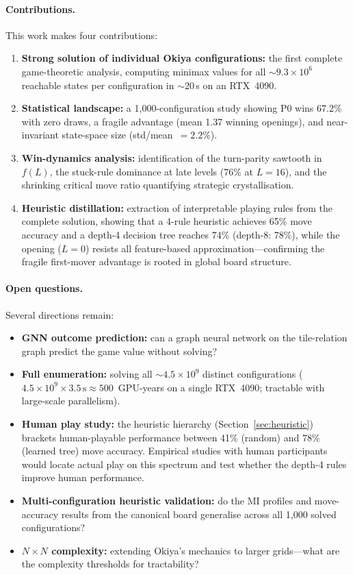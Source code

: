 \documentclass[11pt,a4paper]{article}
\begin{document}
\paragraph{Contributions.}
This work makes four contributions:
\begin{enumerate}
  \item \textbf{Strong solution of individual Okiya configurations:} the
    first complete game-theoretic analysis, computing minimax values for
    all ${\sim}9.3 \times 10^{6}$ reachable states per configuration in
    ${\sim}20$\,s on an RTX~4090.
  \item \textbf{Statistical landscape:} a 1{,}000-configuration study
    showing P0 wins 67.2\% with zero draws, a fragile advantage (mean 1.37
    winning openings), and near-invariant state-space size
    (std/mean~$= 2.2$\%).
  \item \textbf{Win-dynamics analysis:} identification of the turn-parity
    sawtooth in $f(L)$, the stuck-rule dominance at late levels (76\% at
    $L{=}16$), and the shrinking critical move ratio quantifying strategic
    crystallisation.
  \item \textbf{Heuristic distillation:} extraction of interpretable
    playing rules from the complete solution, showing that a 4-rule
    heuristic achieves 65\% move accuracy and a depth-4 decision tree
    reaches 74\% (depth-8: 78\%), while the opening ($L{=}0$) resists
    all feature-based
    approximation---confirming the fragile first-mover advantage is
    rooted in global board structure.
\end{enumerate}

\paragraph{Open questions.}
Several directions remain:
\begin{itemize}
  \item \textbf{GNN outcome prediction:} can a graph neural network on the
    tile-relation graph predict the game value without solving?
  \item \textbf{Full enumeration:} solving all ${\sim}4.5 \times 10^{9}$
    distinct configurations ($4.5 \times 10^{9} \times 3.5\,\text{s}
    \approx 500$~GPU-years on a single RTX~4090; tractable with
    large-scale parallelism).
  \item \textbf{Human play study:} the heuristic hierarchy
    (Section~\ref{sec:heuristic}) brackets human-playable performance
    between 41\% (random) and 78\% (learned tree) move accuracy.
    Empirical studies with human participants would locate actual play
    on this spectrum and test whether the depth-4 rules improve
    human performance.
  \item \textbf{Multi-configuration heuristic validation:} do the MI
    profiles and move-accuracy results from the canonical board
    generalise across all 1{,}000 solved configurations?
  \item \textbf{$N{\times}N$ complexity:} extending Okiya's mechanics to
    larger grids---what are the complexity thresholds for tractability?
\end{itemize}
\end{document}
